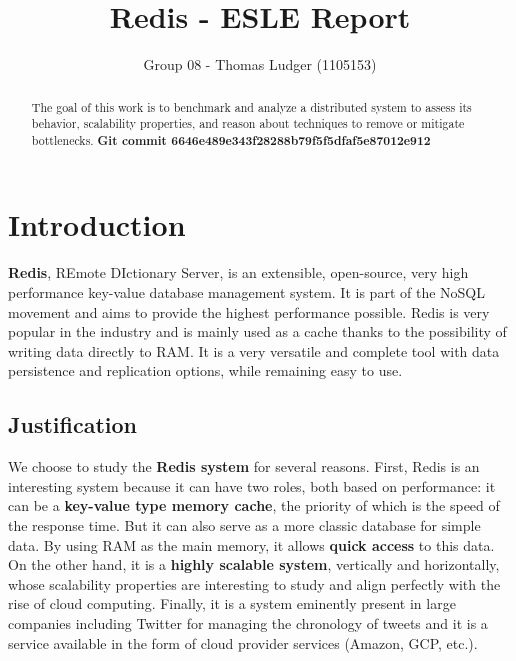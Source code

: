 \documentclass[runningheads]{llncs}
\begin{document}
\title{Redis - ESLE Report}
\author{Group 08 - Thomas Ludger (1105153)}
\maketitle
\begin{abstract}
The goal of this work is to benchmark and analyze a distributed system to assess its behavior, scalability properties, and reason about techniques to remove or mitigate bottlenecks. \textbf{Git commit 6646e489e343f28288b79f5f5dfaf5e87012e912}

\end{abstract}

\section{Introduction}
\textbf{Redis}, REmote DIctionary Server, is an extensible, open-source, very high performance key-value database management system. It is part of the NoSQL movement and aims to provide the highest performance possible. Redis is very popular in the industry and is mainly used as a cache thanks to the possibility of writing data directly to RAM. It is a very versatile and complete tool with data persistence and replication options, while remaining easy to use.

\subsection{Justification}
We choose to study the \textbf{Redis system} for several reasons. First, Redis is an interesting system because it can have two roles, both based on performance: it can be a \textbf{key-value type memory cache}, the priority of which is the speed of the response time. But it can also serve as a more classic database for simple data. By using RAM as the main memory, it allows \textbf{quick access} to this data.
On the other hand, it is a \textbf{highly scalable system}, vertically and horizontally, whose scalability properties are interesting to study and align perfectly with the rise of cloud computing.
Finally, it is a system eminently present in large companies including Twitter for managing the chronology of tweets and it is a service available in the form of cloud provider services (Amazon, GCP, etc.).

\newpage
\end{document}
